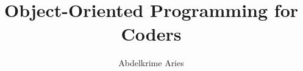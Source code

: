 \documentclass{KodeBook}
\title{Object-Oriented Programming for Coders}
\author{Abdelkrime Aries}
\begin{document}
\maketitle

\frontmatter





\kodetoc

\mainmatter













%



\backmatter


\end{document}
